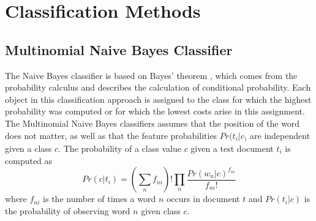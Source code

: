 \documentclass[a4paper, 11pt,titlepage,oneside,openany]{book}
\begin{document}
\section{Classification Methods}
\subsection{Multinomial Naive Bayes Classifier}
The Naive Bayes classifier is based on  Bayes' theorem \cite{btheory}, which comes from the probability calculus and describes the calculation of conditional probability. Each object in this classification approach is assigned to the class for which the highest probability was computed or for which the lowest costs arise in this assignment.  \\
\noindent The Multinomial Naive Bayes classifiers assumes that the position of the word does not matter, as well as  that the feature probabilities $Pr(t_i|c_)$ are independent given a class $c$.
The probability of a class value $c$ given a test document $t_i$ is computed as \cite{multinomialnb}
\[
Pr(c|t_i)=(\sum_{n}f_{ni})!\prod_{n}\frac{Pr(w_n|c)^{f_{ni}}}{f_{ni}!}
\]
where $f_{ni}$ is the number of times a word $n$ occurs in document $t$ and $Pr(t_i|c)$ is the probability of observing word $n$ given class $c$.
\end{document}
